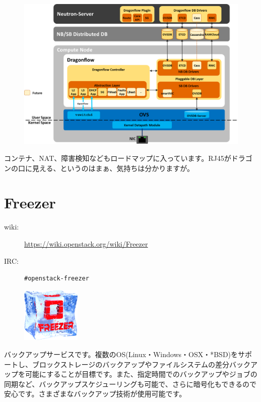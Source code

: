 \begin{figure}[htb]
	\begin{center}
		\includegraphics[width=\textwidth]{img/dragonflow_distributed_architecture.png}
	\end{center}
\end{figure}

コンテナ、NAT、障害検知などもロードマップに入っています。RJ45がドラゴンの口に見える、というのはまぁ、気持ちは分かりますが。

\section{Freezer}

\begin{description}
	\item[wiki:] \url{https://wiki.openstack.org/wiki/Freezer}
	\item[IRC:] \verb|#openstack-freezer|
\end{description}

\begin{figure}
	\begin{center}
		\includegraphics[width=0.25\textwidth]{img/freezer_logo.png}
	\end{center}
\end{figure}

バックアップサービスです。複数のOS(Linux・Windows・OSX・*BSD)をサポートし、ブロックストレージのバックアップやファイルシステムの差分バックアップを可能にすることが目標です。また、指定時間でのバックアップやジョブの同期など、バックアップスケジューリングも可能で、さらに暗号化もできるので安心です。さまざまなバックアップ技術が使用可能です。

